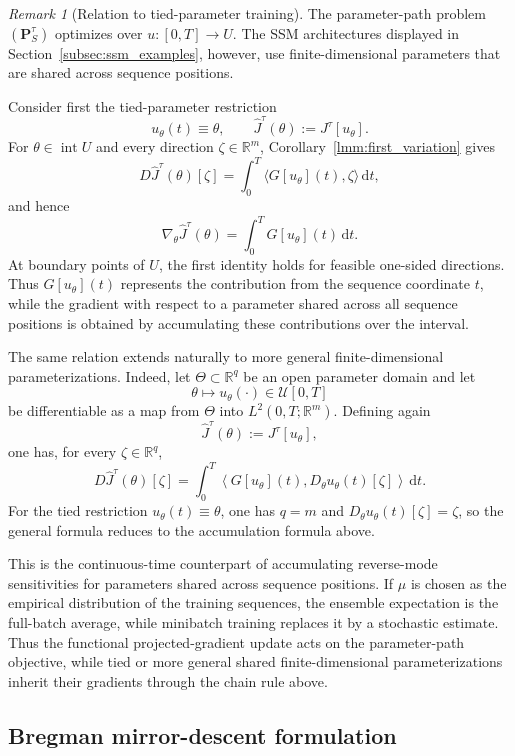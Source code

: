 \documentclass[11pt]{amsart}
\numberwithin{equation}{section} %
\newcommand{\dd}{\mathrm{d}}
\theoremstyle{remark}
\newtheorem{remark}{Remark}[section]
\begin{document}
\begin{remark}[Relation to tied-parameter training]
\label{rem:tied-parameter-training}
The parameter-path problem $(\mathbf P_S^\tau)$ optimizes over
$u:[0,T]\to U$. The SSM architectures displayed in
Section~\ref{subsec:ssm_examples}, however, use finite-dimensional
parameters that are shared across sequence positions.

Consider first the tied-parameter restriction
\[
u_\theta(t)\equiv\theta,
\qquad
\widehat J^\tau(\theta):=J^\tau[u_\theta].
\]
For $\theta\in\operatorname{int}U$ and every direction
$\zeta\in\mathbb R^m$, Corollary~\ref{lmm:first_variation} gives
\[
D\widehat J^\tau(\theta)[\zeta]
=
\int_0^T
\langle G[u_\theta](t),\zeta\rangle\,\dd t,
\]
and hence
\[
\nabla_\theta\widehat J^\tau(\theta)
=
\int_0^T G[u_\theta](t)\,\dd t.
\]
At boundary points of $U$, the first identity holds for feasible one-sided
directions. Thus $G[u_\theta](t)$ represents the contribution from the
sequence coordinate $t$, while the gradient with respect to a parameter
shared across all sequence positions is obtained by accumulating these
contributions over the interval.

The same relation extends naturally to more general finite-dimensional
parameterizations. Indeed, let $\Theta\subset\mathbb R^q$ be an open
parameter domain and let
\[
\theta\mapsto u_\theta(\cdot)\in\mathcal U[0,T]
\]
be differentiable as a map from $\Theta$ into
$L^2(0,T;\mathbb R^m)$. Defining again
\[
\widehat J^\tau(\theta):=J^\tau[u_\theta],
\]
one has, for every $\zeta\in\mathbb R^q$,
\[
D\widehat J^\tau(\theta)[\zeta]
=
\int_0^T
\left\langle
G[u_\theta](t),
D_\theta u_\theta(t)[\zeta]
\right\rangle\,\dd t.
\]
For the tied restriction $u_\theta(t)\equiv\theta$, one has $q=m$ and
$D_\theta u_\theta(t)[\zeta]=\zeta$, so the general formula reduces to
the accumulation formula above.

This is the continuous-time counterpart of accumulating reverse-mode
sensitivities for parameters shared across sequence positions. If $\mu$ is
chosen as the empirical distribution of the training sequences, the ensemble
expectation is the full-batch average, while minibatch training replaces it
by a stochastic estimate. Thus the functional projected-gradient update acts
on the parameter-path objective, while tied or more general shared
finite-dimensional parameterizations inherit their gradients through the
chain rule above.
\end{remark}

\subsection{Bregman mirror-descent formulation}
\label{subsec:bregman-mirror-descent}
\end{document}
